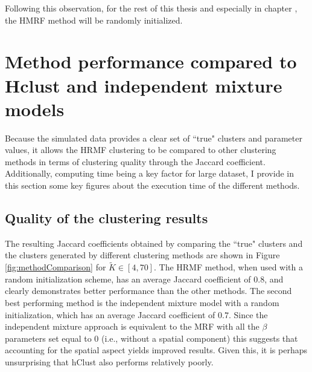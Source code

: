 Following this observation, for the rest of this thesis and especially in chapter , the HMRF method will be randomly initialized.

\section{Method performance compared to Hclust and independent mixture models}
 Because the simulated data provides a clear set of ``true" clusters and parameter values, it allows the HRMF clustering to be compared to other clustering methods in terms of clustering quality through the Jaccard coefficient. Additionally, computing time being a key factor for large dataset, I provide in this section some key figures about the execution time of the different methods.
	\subsection{Quality of the clustering results}
	
	The resulting Jaccard coefficients obtained by comparing the ``true" clusters and the clusters generated by different clustering methods are shown in Figure \ref{fig:methodComparison} for $\tilde{K} \in [4,70]$. The HRMF method, when used with a random initialization scheme, has an average Jaccard coefficient of $0.8$, and clearly demonstrates better performance than the other methods. The second best performing method is the independent mixture model with a random initialization, which has an average Jaccard coefficient of $0.7$. Since the independent mixture approach is equivalent to the MRF with all the $\beta$ parameters set equal to 0 (i.e., without a spatial component) this suggests that accounting for the spatial aspect yields improved results.  Given this, it is perhaps unsurprising that hClust also performs relatively poorly.\\
	
